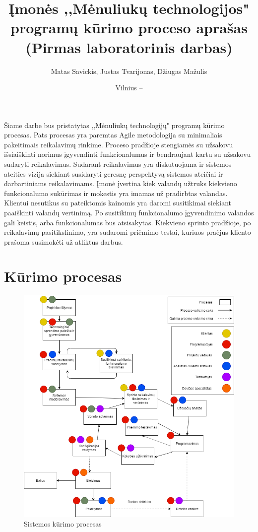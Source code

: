 \documentclass{VUMIFPSkursinis}
\title{Įmonės ,,Mėnuliukų technologijos" programų kūrimo proceso aprašas (Pirmas laboratorinis darbas)}
\author{Matas Savickis, Justas Tvarijonas, Džiugas Mažulis}
\date{Vilnius – \the\year}
\begin{document}
\maketitle

\tableofcontents

	Šiame darbe bus pristatytas ,,Mėnuliukų technologijų" programų kūrimo procesas.
	Pats procesas yra paremtas Agile metodologija su minimaliais pakeitimais reikalavimų rinkime.
	Proceso pradžioje stengiamės su užsakovu išsiaiškinti norimus įgyvendinti funkcionalumus ir bendraujant kartu su užsakovu sudaryti reikalavimus. 
	Sudarant reikalavimus yra diskutuojama ir sistemos ateities vizija siekiant susidaryti geresnę perspektyvą sistemos ateičiai ir darbartiniams reikalavimams.
	Įmonė įvertina kiek valandų užtruks kiekvieno funkcionalumo sukūrimas ir mokestis yra imamas už pradirbtas valandas.
	Klientui nesutikus su pateiktomis kainomis yra daromi susitikimai siekiant paaiškinti valandų vertinimą. Po susitikimų funkcionalumo įgyvendinimo valandos gali keistis, arba funkcionalumas bus atsisakytas. 
	Kiekvieno sprinto pradžioje, po reikalavimų pasitikslinimo, yra sudaromi priėmimo testai, kuriuos praėjus kliento prašoma susimokėti už atliktus darbus.

\section{Kūrimo procesas}
	\begin{figure}[htbp]
	\includegraphics[scale=0.6]{img/SoftwareProcessMoonTechnologies}
	\caption{Sistemos kūrimo procesas} %
	\label{img:kurimoProcesas}
	\end{figure}
\end{document}
